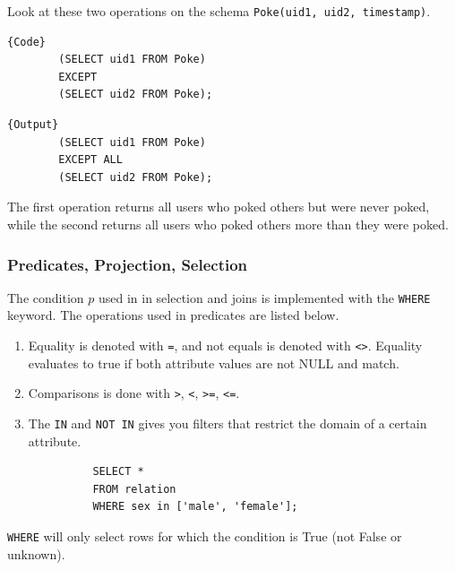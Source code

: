     \begin{example}
      Look at these two operations on the schema \texttt{Poke(uid1, uid2, timestamp)}. 

      \noindent\begin{minipage}{.5\textwidth}
      \begin{lstlisting}[]{Code}
        (SELECT uid1 FROM Poke) 
        EXCEPT 
        (SELECT uid2 FROM Poke); 
      \end{lstlisting}
      \end{minipage}
      \hfill
      \begin{minipage}{.49\textwidth}
      \begin{lstlisting}[]{Output}
        (SELECT uid1 FROM Poke) 
        EXCEPT ALL
        (SELECT uid2 FROM Poke); 
      \end{lstlisting}
      \end{minipage}
      The first operation returns all users who poked others but were never poked, while the second returns all users who poked others more than they were poked. 
    \end{example}

  \subsubsection{Predicates, Projection, Selection}

    \begin{definition}
      The condition $p$ used in in selection and joins is implemented with the \texttt{WHERE} keyword. The operations used in predicates are listed below. 
      \begin{enumerate}
        \item Equality is denoted with \texttt{=}, and not equals is denoted with \texttt{<>}. Equality evaluates to true if both attribute values are not NULL and match.  
        \item Comparisons is done with \texttt{>}, \texttt{<}, \texttt{>=}, \texttt{<=}. 
        \item The \texttt{IN} and \texttt{NOT IN} gives you filters that restrict the domain of a certain attribute. 
        \begin{lstlisting}
          SELECT * 
          FROM relation 
          WHERE sex in ['male', 'female']; 
        \end{lstlisting}
      \end{enumerate} 
      \texttt{WHERE} will only select rows for which the condition is True (not False or unknown). 
    \end{definition}


